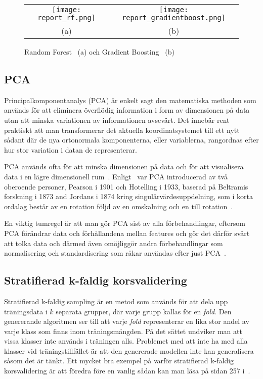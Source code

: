 \documentclass[12pt,a4paper]{article}
\begin{document}
\begin{figure}[t]
    \centering
    \begin{tabular}{cc}
        \texttt{[image: report\_rf.png]} & 
        \texttt{[image: report\_gradientboost.png]} \\
        (a) & (b) \\
    \end{tabular}
    \caption{\footnotesize{Random Forest~\citep{IBM} (a) och Gradient Boosting~\citep{Geron} (b)}}\label{fig:rf_xgboost}
\end{figure}

\subsection{PCA}

Principalkomponentanalys (PCA) är enkelt sagt den matematiska methoden som används för att eliminera överflödig information i form av dimensionen på data utan att minska variationen av informationen avsevärt. Det innebär rent praktiskt att man transformerar det aktuella koordinatsystemet till ett nytt sådant där de nya ortonormala komponenterna, eller variablerna, rangordnas efter hur stor variation i datan de representerar.

PCA används ofta för att minska dimensionen på data och för att visualisera data i en lägre dimensionell rum~\citep{Jolliffe}. Enligt~\cite{Jolliffe} var PCA introducerad av två oberoende personer, Pearson i 1901 och Hotelling i 1933, baserad på Beltramis forskning i 1873 and Jordans i 1874 kring singulärvärdesuppdelning, som i korta ordalag består av en rotation följd av en omskalning och en till rotation~\citep{Wikipedia}.

En viktig tumregel är att man gör PCA sist av alla förbehandlingar, eftersom PCA förändrar data och förhållandena mellan features och gör det därför svårt att tolka data och därmed även omöjliggör andra förbehandlingar som normalisering och standardisering som råkar användas efter just PCA~\citep{Datacamp}.

\subsection{Stratifierad k-faldig korsvalidering}

Stratifierad k-faldig sampling är en metod som används för att dela upp träningsdata i $k$ separata grupper, där varje grupp kallas för en \emph{fold}. Den genererande algoritmen ser till att varje \emph{fold} representerar en lika stor andel av varje klass som finns inom träningsmängden. På det sättet undviker man att vissa klasser inte används i träningen alls. Problemet med att inte ha med alla klasser vid träningstillfället är att den genererade modellen inte kan generalisera såsom det är tänkt. Ett mycket bra exempel på varför stratifierad k-faldig korsvalidering är att föredra före en vanlig sådan kan man läsa på sidan 257 i~\cite{Muller}.
\end{document}

